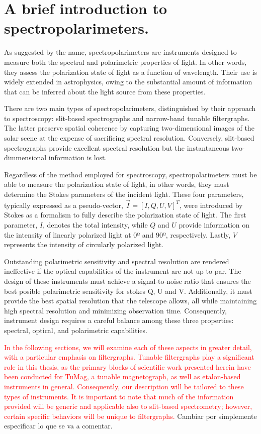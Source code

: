 \section{A brief introduction to spectropolarimeters.}

As suggested by the name, spectropolarimeters are instruments designed to measure both the spectral and polarimetric properties of light. In other words, they assess the polarization state of light as a function of wavelength. Their use is widely extended in astrophysics, owing to the substantial amount of information that can be inferred about the light source from these properties.

There are two main types of spectropolarimeters, distinguished by their approach to spectroscopy: slit-based spectrographs and narrow-band tunable filtergraphs. The latter preserve spatial coherence by capturing two-dimensional images of the solar scene at the expense of sacrificing spectral resolution. Conversely, slit-based spectrographs provide excellent spectral resolution but the instantaneous two-dimmensional information is lost. 

Regardless of the method employed for spectroscopy, spectropolarimeters must be able to measure the polarization state of light, in other words, they must determine the Stokes parameters of the incident light. These four parameters, typically expressed as a pseudo-vector, $ \vec{I} = [I, Q, U, V] ^{T}$, were introduced by Stokes \citep{Stokes_vector} as a formalism to fully describe the polarization state of light. The first parameter, $I$, denotes the total intensity, while $Q$ and $U$ provide information on the intensity of linearly polarized light at 0º and 90º, respectively. Lastly, $V$ represents the intensity of circularly polarized light.


Outstanding polarimetric sensitivity and spectral resolution are rendered ineffective if the optical capabilities of the instrument are not up to par. The design of these instruments must achieve a signal-to-noise ratio that ensures the best posible polarimetric sensitivity for stokes Q, U and V. Additionally, it must provide the best spatial resolution that the telescope allows, all while maintaining high spectral resolution and minimizing observation time. Consequently, instrument design requires a careful balance among these three properties: spectral, optical, and polarimetric capabilities.

\textcolor{red}{In the following sections, we will examine each of these aspects in greater detail, with a particular emphasis on filtergraphs. Tunable filtergraphs play a significant role in this thesis, as the primary blocks of scientific work presented herein have been conducted for TuMag, a tunable magnetograph, as well as etalon-based instruments in general. Consequently, our description will be tailored to these types of instruments. It is important to note that much of the information provided will be generic and applicable also to slit-based spectrometry; however, certain specific behaviors will be unique to filtergraphs. }
Cambiar por simplemente especificar lo que se va a comentar. 


